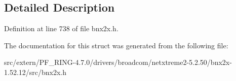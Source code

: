 \subsection{Detailed Description}


Definition at line 738 of file bnx2x.h.



The documentation for this struct was generated from the following file:\begin{DoxyCompactItemize}
\item 
src/extern/PF\_\-RING-\/4.7.0/drivers/broadcom/netxtreme2-\/5.2.50/bnx2x-\/1.52.12/src/bnx2x.h\end{DoxyCompactItemize}
